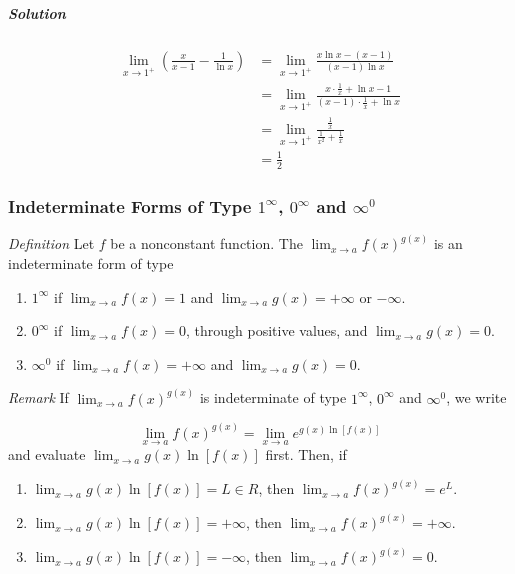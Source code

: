 \documentclass[
  letterpaper,
  DIV=11,
  numbers=noendperiod]{scrartcl}
\let\oldsubparagraph\subparagraph
\renewcommand{\subparagraph}[1]{\oldsubparagraph{#1}\mbox{}}
\theoremstyle{plain}
\theoremstyle{remark}
\begin{document}
\hypertarget{solution-3}{%
\subparagraph{\texorpdfstring{\emph{Solution}}{Solution}}\label{solution-3}}

\[
\begin{aligned}
\displaystyle\lim_{x\to 1^+}{\left(\frac{x}{x-1}-\frac{1}{\ln x}\right)}&=\displaystyle\lim_{x\to 1^+}{\frac{x\ln x -(x-1)}{(x-1)\ln x}}\\&=\displaystyle\lim_{x\to 1^+}{\frac{x\cdot \frac{1}{x}+\ln x-1}{(x-1)\cdot \frac{1}{x}+\ln x}}\\&=\displaystyle\lim_{x\to 1^+}{\frac{\frac{1}{x}}{\frac{1}{x^2}+\frac{1}{x}}}\\&=\frac{1}{2}
\end{aligned}
\]

\hypertarget{indeterminate-forms-of-type-1infty-0infty-and-infty-0}{%
\subsubsection{\texorpdfstring{Indeterminate Forms of Type \(1^\infty\),
\(0^\infty\) and
\(\infty ^0\)}{Indeterminate Forms of Type 1\^{}\textbackslash infty, 0\^{}\textbackslash infty and \textbackslash infty \^{}0}}\label{indeterminate-forms-of-type-1infty-0infty-and-infty-0}}

\emph{Definition} Let \(f\) be a nonconstant function. The
\(\displaystyle\lim_{x\to a}{f(x)^{g(x)}}\) is an indeterminate form of
type

\begin{enumerate}
\def\labelenumi{\arabic{enumi}.}
\item
  \(1^\infty\) if \(\displaystyle\lim_{x\to a}{f(x)=1}\) and
  \(\displaystyle\lim_{x\to a}{g(x)=+\infty}\) or \(-\infty\).
\item
  \(0^\infty\) if \(\displaystyle\lim_{x\to a}{f(x)=0}\), through
  positive values, and \(\displaystyle\lim_{x\to a}{g(x)=0}\).
\item
  \(\infty ^0\) if \(\displaystyle\lim_{x\to a}{f(x)=+\infty}\) and
  \(\displaystyle\lim_{x\to a}{g(x)=0}\).
\end{enumerate}

\emph{Remark} If \(\displaystyle\lim_{x\to a}{f(x)^{g(x)}}\) is
indeterminate of type \(1^\infty\), \(0^\infty\) and \(\infty ^0\), we
write

\[
\displaystyle\lim_{x\to a}{f(x)^{g(x)}}=\displaystyle\lim_{x\to a}{e^{g(x) \ln [f(x)]}}
\] and evaluate \(\displaystyle\lim_{x\to a}{g(x) \ln [f(x)]}\) first.
Then, if

\begin{enumerate}
\def\labelenumi{\arabic{enumi}.}
\item
  \(\displaystyle\lim_{x\to a}{g(x) \ln [f(x)]}=L \in R\), then
  \(\displaystyle\lim_{x\to a}{f(x)^{g(x)}}=e^L\).
\item
  \(\displaystyle\lim_{x\to a}{g(x) \ln [f(x)]}=+\infty\), then
  \(\displaystyle\lim_{x\to a}{f(x)^{g(x)}}=+\infty\).
\item
  \(\displaystyle\lim_{x\to a}{g(x) \ln [f(x)]}=-\infty\), then
  \(\displaystyle\lim_{x\to a}{f(x)^{g(x)}}=0\).
\end{enumerate}
\end{document}
